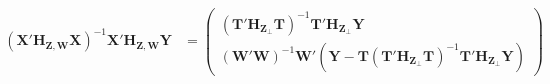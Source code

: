 \documentclass{mynotes}
\newcommand{\by}{\mathbf{Y}} %
\newcommand{\bx}{\mathbf{X}} %
\newcommand{\bt}{\mathbf{T}} %
\newcommand{\bz}{\mathbf{Z}} %
\newcommand{\bw}{\mathbf{W}} %
\newcommand{\Hm}[1]{\mathbf{H}_{#1}} %
\begin{document}
\dotfill





\begin{align*}
  \begin{split}
    (\bx'\Hm{\bz,\bw}\bx)^{-1}\bx'\Hm{\bz,\bw}\by &=
    \begin{pmatrix}
      (\bt'\Hm{\bz_{\perp}}\bt)^{-1} \bt'\Hm{\bz_{\perp}}\by\\
      (\bw'\bw)^{-1} \bw'(\by-\bt (\bt'\Hm{\bz_{\perp}}\bt)^{-1}
      \bt'\Hm{\bz_{\perp}}\by)
    \end{pmatrix}
  \end{split}
\end{align*}

\SmallBib

\end{document}
